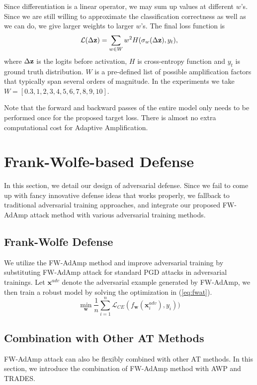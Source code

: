 \documentclass{article}
\begin{document}
        Since differentiation is a linear operator, we may sum up values at different $w$'s. Since we are still willing to approximate the classification correctness as well as we can do, we give larger weights to larger $w$'s. The final loss function is
        \begin{equation}
            \mathcal{L}(\Delta \mathbf{z}) = \sum_{w \in W} w^2 H(\sigma_w(\Delta \mathbf{z}), y_t),
        \end{equation}
        where $\Delta \mathbf{z}$ is the logits before activation, $H$ is cross-entropy function and $y_t$ is ground truth distribution. $W$ is a pre-defined list of possible amplification factors that typically span several orders of magnitude. In the experiments we take $W = [0.3, 1, 2, 3, 4, 5, 6, 7, 8, 9, 10]$.
        
        Note that the forward and backward passes of the entire model only needs to be performed once for the proposed target loss. There is almost no extra computational cost for Adaptive Amplification.


\section{Frank-Wolfe-based Defense}\label{sec:DefenseMethodology}
    In this section, we detail our design of adversarial defense. Since we fail to come up with fancy innovative defense ideas that works properly, we fallback to traditional adversarial training approaches, and integrate our proposed FW-AdAmp attack method with various adversarial training methods.

    \subsection{Frank-Wolfe Defense}
        We utilize the FW-AdAmp method and improve adversarial training by substituting FW-AdAmp attack for standard PGD attacks in adversarial trainings. Let $\mathbf{x}^{adv}$ denote the adversarial example generated by FW-AdAmp, we then train a robust model by solving the optimization in (\ref{eq:fwat}).
        \begin{equation}\label{eq:fwat}
            \min_{\mathbf{w}} \frac{1}{n}\sum_{i=1}^n \mathcal{L}_{CE}(f_{\mathbf{w}}(\mathbf{x}^{adv}_i), y_i))
        \end{equation}

    \subsection{Combination with Other AT Methods}
        FW-AdAmp attack can also be flexibly combined with other AT methods. In this section, we introduce the combination of FW-AdAmp method with AWP and TRADES.
\end{document}
